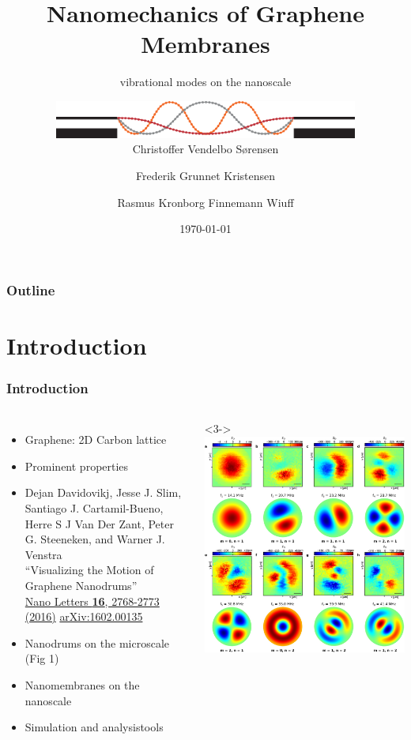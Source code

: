 \documentclass[hyperref={colorlinks=true,urlcolor=blue,linkcolor=.},aspectratio=1610,mathserif]{beamer}
\title{Nanomechanics of Graphene Membranes}
\subtitle{vibrational modes on the nanoscale}
\author{\centering\includegraphics[width=10cm]{Miscellaneous/Graphics/Logo.eps}\\Christoffer Vendelbo Sørensen \and Frederik Grunnet Kristensen \and Rasmus Kronborg Finnemann Wiuff}
\institute{Technical University of Denmark}
\date{\today}
\begin{document}
\begin{frame}[plain]
 \titlepage
\end{frame}

\begin{frame}[plain]
 \frametitle{Outline}
 \tableofcontents
\end{frame}

\section{Introduction}

\begin{frame}
 \frametitle{Introduction}
 \begin{columns}[T]
  \begin{itemize}
   \item<1-> Graphene: 2D Carbon lattice
   \item<2-> Prominent properties
   \item<3-> Dejan Davidovikj, Jesse J. Slim, Santiago J. Cartamil-Bueno, Herre S J Van Der Zant, Peter G. Steeneken, and Warner J. Venstra\\
         “Visualizing the Motion of Graphene Nanodrums”\\
         \href{http://dx.doi.org/10.1021/acs.nanolett.6b00477}{Nano Letters \textbf{16}, 2768-2773 (2016)} \href{http://arxiv.org/abs/1602.00135}{arXiv:1602.00135}
   \item<4-> Nanodrums on the microscale (Fig 1)
   \item<5-> Nanomembranes on the nanoscale
   \item<6-> Simulation and analysistools
  \end{itemize}
  <3->
  \includegraphics[width=\columnwidth]{Figures/motivation.eps}
 \end{columns}
\end{frame}
\end{document}
